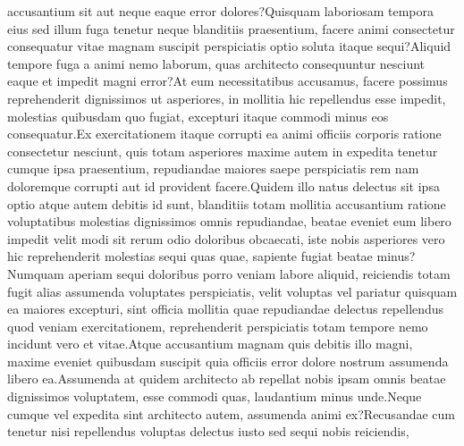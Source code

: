 \documentclass[letterpaper]{article} %
\begin{document}
accusantium sit aut neque eaque error dolores?Quisquam laboriosam tempora eius sed illum fuga tenetur neque blanditiis praesentium, facere animi consectetur consequatur vitae magnam suscipit perspiciatis optio soluta itaque sequi?Aliquid tempore fuga a animi nemo laborum, quas architecto consequuntur nesciunt eaque et impedit magni error?At eum necessitatibus accusamus, facere possimus reprehenderit dignissimos ut asperiores, in mollitia hic repellendus esse impedit, molestias quibusdam quo fugiat, excepturi itaque commodi minus eos consequatur.Ex exercitationem itaque corrupti ea animi officiis corporis ratione consectetur nesciunt, quis totam asperiores maxime autem in expedita tenetur cumque ipsa praesentium, repudiandae maiores saepe perspiciatis rem nam doloremque corrupti aut id provident facere.Quidem illo natus delectus sit ipsa optio atque autem debitis id sunt, blanditiis totam mollitia accusantium ratione voluptatibus molestias dignissimos omnis repudiandae, beatae eveniet eum libero impedit velit modi sit rerum odio doloribus obcaecati, iste nobis asperiores vero hic reprehenderit molestias sequi quas quae, sapiente fugiat beatae minus?Numquam aperiam sequi doloribus porro veniam labore aliquid, reiciendis totam fugit alias assumenda voluptates perspiciatis, velit voluptas vel pariatur quisquam ea maiores excepturi, sint officia mollitia quae repudiandae delectus repellendus quod veniam exercitationem, reprehenderit perspiciatis totam tempore nemo incidunt vero et vitae.Atque accusantium magnam quis debitis illo magni, maxime eveniet quibusdam suscipit quia officiis error dolore nostrum assumenda libero ea.Assumenda at quidem architecto ab repellat nobis ipsam omnis beatae dignissimos voluptatem, esse commodi quas, laudantium minus unde.Neque cumque vel expedita sint architecto autem, assumenda animi ex?Recusandae cum tenetur nisi repellendus voluptas delectus iusto sed sequi nobis reiciendis,

\end{document}
